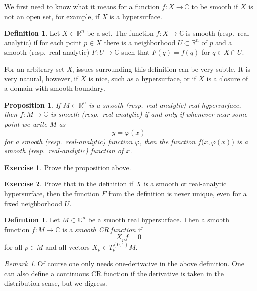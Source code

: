 \documentclass[12pt,openany]{book}
\newcommand{\C}{{\mathbb{C}}}
\newcommand{\R}{{\mathbb{R}}}
\newcommand{\myindex}[1]{#1\index{#1}}
\theoremstyle{plain}
\newtheorem{prop}[thm]{Proposition}
\theoremstyle{remark}
\newtheorem{remark}[thm]{Remark}
\theoremstyle{definition}
\newtheorem{defn}[thm]{Definition}
\newenvironment{exbox}{%
    \def\FrameCommand{\vrule width 1pt \relax\hspace {10pt}}%
    \MakeFramed {\advance \hsize -\width \FrameRestore }%
}{%
    \endMakeFramed
}
\theoremstyle{exercise}
\newtheorem{exercise}{Exercise}[section]
\theoremstyle{example}
\begin{document}
We first need to know what it means for a function $f \colon X \to \C$
to be smooth if $X$ is not an open set, for example, if $X$ is a hypersurface.

\begin{defn}
Let $X \subset \R^n$ be a set.
The function $f \colon X \to \C$ is smooth (resp.\
real-analytic) if for each point $p \in X$ there is a
neighborhood $U \subset \R^n$ of $p$ and a smooth (resp.\ real-analytic) $F
\colon U \to \C$ such that $F(q) = f(q)$ for $q \in X \cap U$.
\end{defn}

For an arbitrary set $X$, issues surrounding this definition can be very subtle.  It
is very natural, however, if $X$ is nice, such as a hypersurface, or if $X$ is
a closure of a domain with smooth boundary.

\begin{prop}
If $M \subset \R^n$ is a smooth (resp.\ real-analytic) real hypersurface, then $f \colon M \to \C$
is smooth (resp.\ real-analytic) if and only if whenever near some point we write $M$
as
\begin{equation*}
y = \varphi(x)
\end{equation*}
for a smooth (resp.\ real-analytic) function $\varphi$, then
the function $f\bigl(x,\varphi(x)\bigr)$ is a smooth (resp.\ real-analytic) function of $x$.
\end{prop}

\begin{exbox}
\begin{exercise}
Prove the proposition above.
\end{exercise}

\begin{exercise}
Prove that in the definition if $X$ is a smooth or real-analytic
hypersurface, then the function $F$ from the definition is never unique,
even for a fixed neighborhood $U$.
\end{exercise}
\end{exbox}

\begin{defn}
Let $M \subset \C^n$ be a smooth real hypersurface.  Then
a smooth function $f \colon M \to \C$ is a
\emph{\myindex{smooth CR function}} if
\begin{equation*}
X_p f = 0
\end{equation*}
for all $p \in M$ and all vectors $X_p \in T^{(0,1)}_p M$.
\end{defn}

\begin{remark}
Of course one only needs one-derivative in the above definition.  One can also
define a continuous CR function if the derivative is taken in the
distribution sense, but we digress.
\end{remark}
\end{document}
